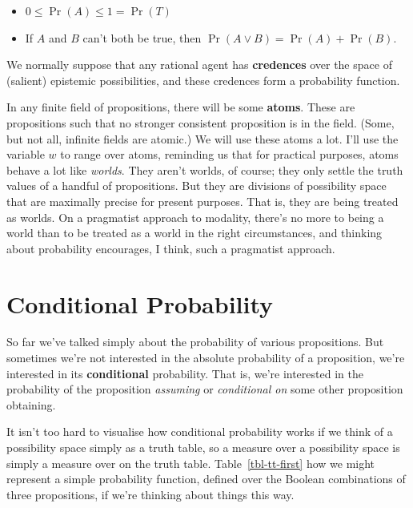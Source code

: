\documentclass[
  11pt,
  letterpaper,
]{scrbook}
\providecommand{\tightlist}{%
  \setlength{\itemsep}{0pt}\setlength{\parskip}{0pt}}
\begin{document}
\begin{itemize}
\tightlist
\item
  \(0 \leq \Pr(A) \leq 1 = \Pr(T)\)
\item
  If \(A\) and \(B\) can't both be true, then
  \(\Pr(A \vee B) = \Pr(A) + \Pr(B)\).
\end{itemize}

We normally suppose that any rational agent has \textbf{credences} over
the space of (salient) epistemic possibilities, and these credences form
a probability function.

In any finite field of propositions, there will be some \textbf{atoms}.
These are propositions such that no stronger consistent proposition is
in the field. (Some, but not all, infinite fields are atomic.) We will
use these atoms a lot. I'll use the variable \(w\) to range over atoms,
reminding us that for practical purposes, atoms behave a lot like
\emph{worlds}. They aren't worlds, of course; they only settle the truth
values of a handful of propositions. But they are divisions of
possibility space that are maximally precise for present purposes. That
is, they are being treated as worlds. On a pragmatist approach to
modality, there's no more to being a world than to be treated as a world
in the right circumstances, and thinking about probability encourages, I
think, such a pragmatist approach.

\section{Conditional Probability}\label{sec-conditional-probability}

So far we've talked simply about the probability of various
propositions. But sometimes we're not interested in the absolute
probability of a proposition, we're interested in its
\textbf{conditional} probability. That is, we're interested in the
probability of the proposition \emph{assuming} or \emph{conditional on}
some other proposition obtaining.

It isn't too hard to visualise how conditional probability works if we
think of a possibility space simply as a truth table, so a measure over
a possibility space is simply a measure over on the truth table.
Table~\ref{tbl-tt-first} how we might represent a simple probability
function, defined over the Boolean combinations of three propositions,
if we're thinking about things this way.
\end{document}
